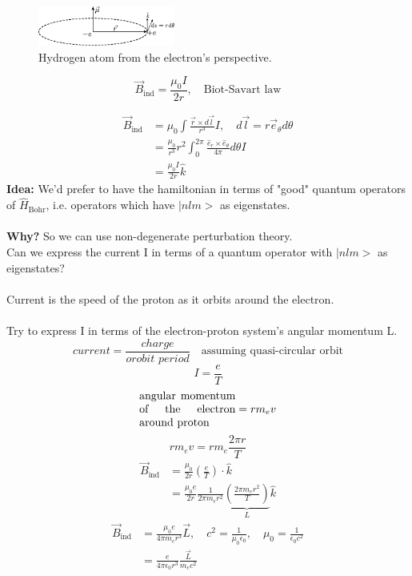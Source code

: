 \documentclass[12pt,fancychapters]{report}
\numberwithin{equation}{section}
\begin{document}
\begin{figure}
  \begin{center}
\includegraphics[width=0.4\textwidth]{../Figures/SPO.pdf}
\caption{Hydrogen atom from the electron's perspective.}
  \end{center}
\end{figure}

\[
  \vec{B}_\text{ind} = \frac{\mu_0 I}{2r}, \quad \text{Biot-Savart law}
\]

\begin{align*}
  \vec{B}_\text{ind} &= \mu_0\int \frac{\vec{r}\times 
  d\vec{l}}{r^3}I, \quad d\vec{l}  = r\vec{e}_\theta d\theta\\
 &= \frac{\mu_0}{r^3}r^2\int_{0}^{2\pi} \frac{\hat{e}_r \times 
\hat{e}_\theta}{4\pi}d\theta I\\
 &= \frac{\mu_0 I}{2r}\hat{k}
\end{align*}
\textbf{Idea:} We'd prefer to have the hamiltonian in terms of "good" quantum operators of 
$\hat{H}_\text{Bohr}$, i.e. operators which have $\big|nlm\big>$ as eigenstates.\\
\\
\textbf{Why?} So we can use non-degenerate perturbation theory.\\
Can we express the current I in terms of a quantum operator with $\big|nlm\big>$ as 
eigenstates?\\
\\
Current is the speed of the proton as it orbits around the electron.\\
\\
Try to express I in terms of the electron-proton system's angular momentum L.
\[
  current = \frac{charge}{orobit\,\,period}\quad \text{assuming quasi-circular orbit}
\]
\[
  I = \frac{e}{T}
\]
\[
  \parbox{0.25\textwidth}{angular momentum of the electron around proton}  =
  r m_e v
\]
\[
  r m_e v = r m_e \frac{2\pi r}{T}
\]
\begin{align*}
  \vec{B}_\text{ind} &= \frac{\mu_0}{2r}\left(\frac{e}{T}\right)\cdot\hat{k}\\
&= \frac{\mu_0 e}{2r} \frac{1}{2\pi m_e r^2}\underbrace{\left(\frac{2\pi m_e r^2}{T}\right)}
_{L}\hat{k}
\end{align*}
\begin{align*}
  \vec{B}_\text{ind} &= \frac{\mu_0 e}{4\pi m_e r^3}\vec{L}, \quad c^2 = 
  \frac{1}{\mu_0 \epsilon_0}, \quad \mu_0 = \frac{1}{\epsilon_0 c^2}\\
                     &= \frac{e}{4\pi \epsilon_0 r^3}\frac{\vec{L}}{m_e c^2} 
\end{align*}
\end{document}
